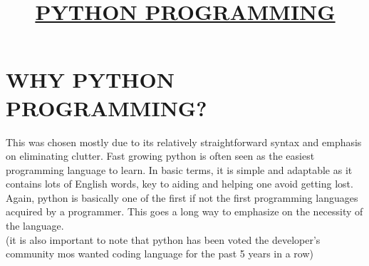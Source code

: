 \documentclass{article}
\begin{document}
	\title{\underline{PYTHON PROGRAMMING}}
	\maketitle
	\section{WHY PYTHON PROGRAMMING?}             
	This was chosen mostly due to its relatively straightforward syntax and emphasis on eliminating clutter. Fast growing python is often seen as the easiest programming language to learn. In basic terms, it is simple and adaptable as it contains lots of English words, key to aiding and helping one avoid getting lost.
	    \\ Again, python is basically one of the first if not the first programming languages acquired by a programmer. This goes a long way to emphasize on the necessity of the language.
	    \\ (it is also important to note that python has been voted the developer's community mos wanted coding language for the past 5 years in a row)
\end{document}
